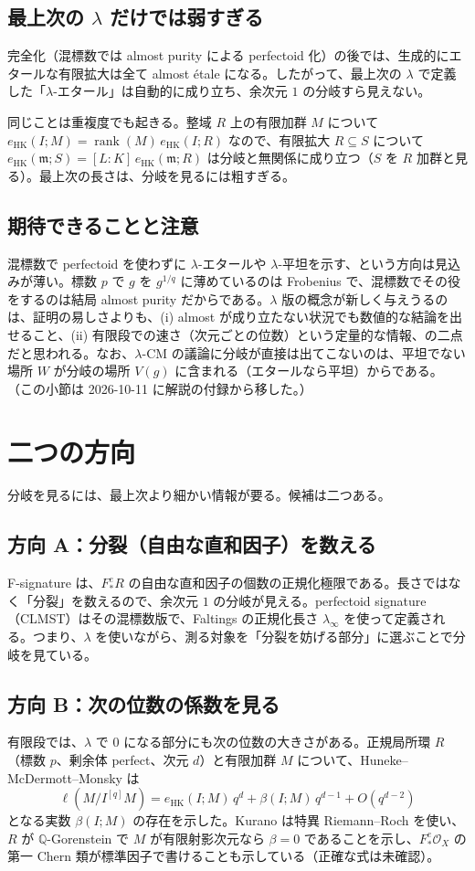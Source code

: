 \documentclass[11pt,a4paper]{ltjsarticle}
\theoremstyle{plain}
\theoremstyle{definition}
\theoremstyle{remark}
\theoremstyle{plain}
\newcommand{\m}{\mathfrak{m}}
\newcommand{\rank}{\operatorname{rank}}
\newcommand{\eHK}{e_{\mathrm{HK}}}
\begin{document}
\subsection{最上次の $\lambda$ だけでは弱すぎる}
完全化（混標数では almost purity による perfectoid 化）の後では、生成的にエタールな有限拡大は全て almost étale になる。したがって、最上次の $\lambda$ で定義した「$\lambda$-エタール」は自動的に成り立ち、余次元 $1$ の分岐すら見えない。

同じことは重複度でも起きる。整域 $R$ 上の有限加群 $M$ について $\eHK(I;M) = \rank(M)\,\eHK(I;R)$ なので、有限拡大 $R\subseteq S$ について $\eHK(\m;S) = [L:K]\,\eHK(\m;R)$ は分岐と無関係に成り立つ（$S$ を $R$ 加群と見る）。最上次の長さは、分岐を見るには粗すぎる。

\subsection{期待できることと注意}
混標数で perfectoid を使わずに $\lambda$-エタールや $\lambda$-平坦を示す、という方向は見込みが薄い。標数 $p$ で $g$ を $g^{1/q}$ に薄めているのは Frobenius で、混標数でその役をするのは結局 almost purity だからである。$\lambda$ 版の概念が新しく与えうるのは、証明の易しさよりも、(i) almost が成り立たない状況でも数値的な結論を出せること、(ii) 有限段での速さ（次元ごとの位数）という定量的な情報、の二点だと思われる。なお、$\lambda$-CM の議論に分岐が直接は出てこないのは、平坦でない場所 $W$ が分岐の場所 $V(g)$ に含まれる（エタールなら平坦）からである。
（この小節は 2026-10-11 に解説の付録から移した。）

\section{二つの方向}

分岐を見るには、最上次より細かい情報が要る。候補は二つある。

\subsection{方向 A：分裂（自由な直和因子）を数える}
F-signature は、$F^e_*R$ の自由な直和因子の個数の正規化極限である。長さではなく「分裂」を数えるので、余次元 $1$ の分岐が見える。perfectoid signature（CLMST）はその混標数版で、Faltings の正規化長さ $\lambda_\infty$ を使って定義される。つまり、$\lambda$ を使いながら、測る対象を「分裂を妨げる部分」に選ぶことで分岐を見ている。

\subsection{方向 B：次の位数の係数を見る}
有限段では、$\lambda$ で $0$ になる部分にも次の位数の大きさがある。正規局所環 $R$（標数 $p$、剰余体 perfect、次元 $d$）と有限加群 $M$ について、Huneke--McDermott--Monsky は
\[
  \ell(M/I^{[q]}M) = \eHK(I;M)\,q^d + \beta(I;M)\,q^{d-1} + O(q^{d-2})
\]
となる実数 $\beta(I;M)$ の存在を示した。Kurano は特異 Riemann--Roch を使い、$R$ が $\mathbb{Q}$-Gorenstein で $M$ が有限射影次元なら $\beta = 0$ であることを示し、$F^e_*\mathcal{O}_X$ の第一 Chern 類が標準因子で書けることも示している（正確な式は未確認）。
\end{document}
